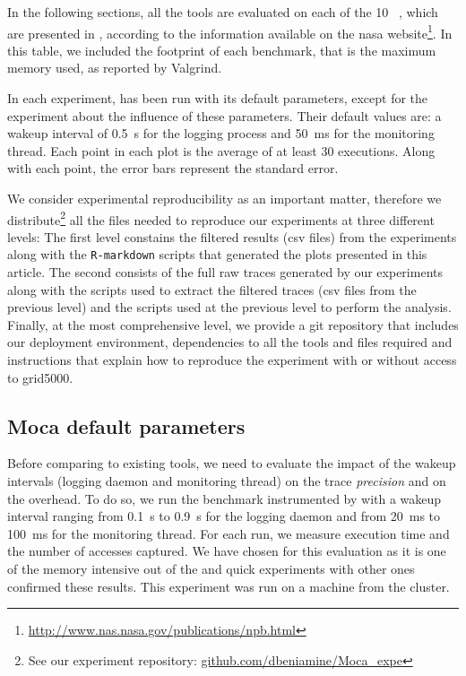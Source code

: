 In the following sections, all the tools are
evaluated on each of the 10 \NPB~\cite{Jin1999}, which are
presented in , according to the information available on the nasa
website\footnote{\url{http://www.nas.nasa.gov/publications/npb.html}}. In this table, we included the footprint of each benchmark, that is the maximum memory
used, as reported by Valgrind.

In each experiment,
\Moca has been run with its default parameters,
except for the experiment about the influence of these parameters.
Their default values are: a wakeup interval of
\SI{0.5}{s} for the logging process and \SI{50}{ms} for the monitoring thread.
Each point in each plot is the average of at least $30$ executions. Along with each point,
the error bars represent the standard error.

We consider experimental reproducibility as an important matter, therefore we
distribute\footnote{See our experiment repository:
    \href{https://github.com/dbeniamine/Moca_expe}{github.com/dbeniamine/Moca\_expe}}
all the files needed to reproduce our experiments at three different levels:
The first level constains the filtered results (csv files) from the
experiments along with the \texttt{R-markdown} scripts that generated the
plots presented in this article.
The second consists of the full raw traces generated by our experiments along
with the scripts used to extract the filtered traces (csv files from the
previous level) and the scripts used at the previous level to perform the
analysis.
Finally, at the most comprehensive level, we provide a git repository that
includes our deployment environment, dependencies to all the tools and files
required and instructions that explain how to reproduce the experiment with or
without access to grid5000.


\subsection{Moca default parameters}
\label{sec:expe-param}

Before comparing \Moca to existing tools, we need to evaluate the impact of
the wakeup intervals (logging daemon and monitoring thread) on the trace
\emph{precision} and on the overhead. To do so, we run the \IS benchmark instrumented by \Moca with
a wakeup interval ranging from \SI{0.1}{s} to  \SI{0.9}{s} for the logging daemon and from \SI{20}{ms} to
\SI{100}{ms} for the monitoring thread. For each run, we measure \IS execution time and the number of
accesses captured. We have chosen \IS for this evaluation as it is one of the memory intensive out of the \NPB
and quick experiments with other ones confirmed these results. This experiment was
run on a machine from the \Edel cluster.

